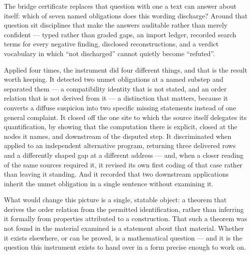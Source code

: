 \documentclass[11pt,a4paper]{article}
\theoremstyle{definition}
\begin{document}
The bridge certificate replaces that question with one a text can answer about
itself: which of seven named obligations does this wording discharge? Around that
question sit disciplines that make the answers auditable rather than merely
confident --- typed rather than graded gaps, an import ledger, recorded search
terms for every negative finding, disclosed reconstructions, and a verdict
vocabulary in which ``not discharged'' cannot quietly become ``refuted''.

Applied four times, the instrument did four different things, and that is the
result worth keeping. It detected two unmet obligations at a named substep and
separated them --- a compatibility identity that is not stated, and an order
relation that is not derived from it --- a distinction that matters, because it
converts a diffuse suspicion into two specific missing statements instead of one
general complaint. It closed off the one site to which the source itself delegates
its quantification, by showing that the computation there is explicit, closed at
the nodes it names, and downstream of the disputed step. It discriminated when
applied to an independent alternative program, returning three delivered rows and
a differently shaped gap at a different address --- and, when a closer reading of the same sources required it,
it revised its own first coding of that case rather than leaving it standing. And
it recorded that two downstream applications inherit the unmet obligation in a
single sentence without examining it.

What would change this picture is a single, statable object: a theorem that
derives the order relation from the permitted identification, rather than
inferring it formally from properties attributed to a construction. That such a
theorem was not found in the material examined is a statement about that material.
Whether it exists elsewhere, or can be proved, is a mathematical question --- and
it is the question this instrument exists to hand over in a form precise enough to
work on.

{}

\end{document}
